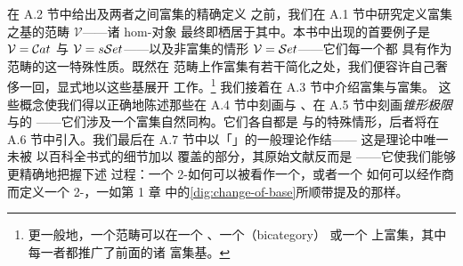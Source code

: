 在 A.2 节中给出\trEnrichedCategory{}及两者之间富集\trFunctor{}的精确定义
之前，我们在 A.1 节中研究定义富集之基的范畴 $\mathcal{V}$——诸 hom-对象
最终即栖居于其中。本书中出现的首要例子是 $\mathcal{V}=\mathcal{C}at$ 与
$\mathcal{V}=s\mathcal{S}et$——以及非富集的情形 $\mathcal{V}=\mathcal{S}et$——它们每一个都
具有作为\trCartesianClosed{}范畴的这一特殊性质。既然在\trCartesianClosed{}%
范畴上作富集有若干简化之处，我们便容许自己奢侈一回，显式地以这些基展开
工作。\footnote{更一般地，一个范畴可以在一个\trMonoidalCategory{}
\cite{bib68}、一个\trBicategory（bicategory）\cite{bib17} 或一个%
\trVirtualDoubleCategory{} \cite{bib75} 上富集，其中每一者都推广了前面的诸
富集基。}
我们接着在 A.3 节中介绍富集\trNaturalTransformation{}与富集\trYonedaLemma。
这些概念使我们得以正确地陈述那些在 A.4 节中刻画\emph{\trCotensor}与%
\emph{\trTensor}、在 A.5 节中刻画\emph{锥形极限}与\emph{\trColimit}的%
\trUniversalProperty{}——它们涉及一个富集自然同构。它们各自都是%
\emph{\trWeightedLimit}与\emph{\trWeightedColimit}的特殊情形，后者将在
A.6 节中引入。我们最后在 A.7 节中以「\trChangeOfBase」的一般理论作结——
这是\trEnrichedCategory{}理论中唯一未被 \cite{bib68} 以百科全书式的细节加以
覆盖的部分，其原始文献反而是 \cite{bib41}——它使我们能够更精确地把握下述
过程：一个 2-\trCategory{}如何可以被看作一个\trSimplicialCategory，或者一个%
\trSimplicialCategory{}如何可以经作商而定义一个 2-\trCategory，一如第 1 章
中的\cref{dig:change-of-base}所顺带提及的那样。

